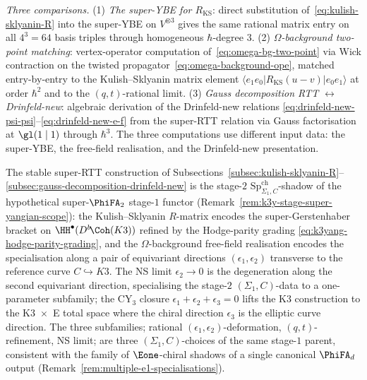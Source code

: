 \noindent\textit{Three comparisons.}
(1) \emph{The super-YBE for $R_{\mathrm{KS}}$}: direct substitution
of~\eqref{eq:kulish-sklyanin-R} into the super-YBE on $V^{\otimes 3}$
gives the same rational matrix entry on all $4^3 = 64$ basis triples
through homogeneous $\hbar$-degree $3$.
(2) \emph{$\Omega$-background two-point matching}: vertex-operator
computation of~\eqref{eq:omega-bg-two-point} via Wick contraction
on the twisted propagator~\eqref{eq:omega-background-ope}, matched
entry-by-entry to the Kulish--Sklyanin matrix element
$\langle e_1 e_0 | R_{\mathrm{KS}}(u - v) | e_0 e_1\rangle$ at order
$\hbar^2$ and to the $(q,t)$-rational limit.
(3) \emph{Gauss decomposition RTT
$\leftrightarrow$ Drinfeld-new}: algebraic derivation of the
Drinfeld-new relations
\eqref{eq:drinfeld-new-psi-psi}--\eqref{eq:drinfeld-new-e-f} from
the super-RTT relation via Gauss factorisation at $\gl(1 \mid 1)$
through $\hbar^3$.  The three computations use different input data:
the super-YBE, the free-field realisation, and the Drinfeld-new
presentation.

\begin{remark}
\label{rem:stable-super-rtt-stage-1-parent}
The stable super-RTT construction of
Subsections~\ref{subsec:kulish-sklyanin-R}--\ref{subsec:gauss-decomposition-drinfeld-new}
is the stage-$2$ $\mathrm{Sp}^{\mathrm{ch}}_{\Sigma_1, C}$-shadow of
the hypothetical super-$\PhiFA_2$ stage-$1$ functor
(Remark~\ref{rem:k3y-stage-super-yangian-scope}): the Kulish--Sklyanin
$R$-matrix encodes the super-Gerstenhaber bracket on
$\HH^\bullet(D^b\!\Coh(K3))$ refined by the Hodge-parity grading
\eqref{eq:k3yang-hodge-parity-grading}, and the $\Omega$-background
free-field realisation encodes the specialisation along a pair of
equivariant directions $(\epsilon_1, \epsilon_2)$ transverse to the
reference curve $C \hookrightarrow K3$. The NS limit $\epsilon_2 \to 0$
is the degeneration along the second equivariant direction, specialising
the stage-$2$ $(\Sigma_1, C)$-data to a one-parameter subfamily; the
CY$_3$ closure $\epsilon_1 + \epsilon_2 + \epsilon_3 = 0$ lifts the
K3 construction to the K3~$\times$~E total space where the chiral
direction $\epsilon_3$ is the elliptic curve direction. The three
subfamilies; rational $(\epsilon_1, \epsilon_2)$-deformation,
$(q, t)$-refinement, NS limit; are three $(\Sigma_1, C)$-choices of
the same stage-$1$ parent, consistent with the family of
$\Eone$-chiral shadows of a single canonical $\PhiFA_d$ output
(Remark~\ref{rem:multiple-e1-specialisations}).
\end{remark}


